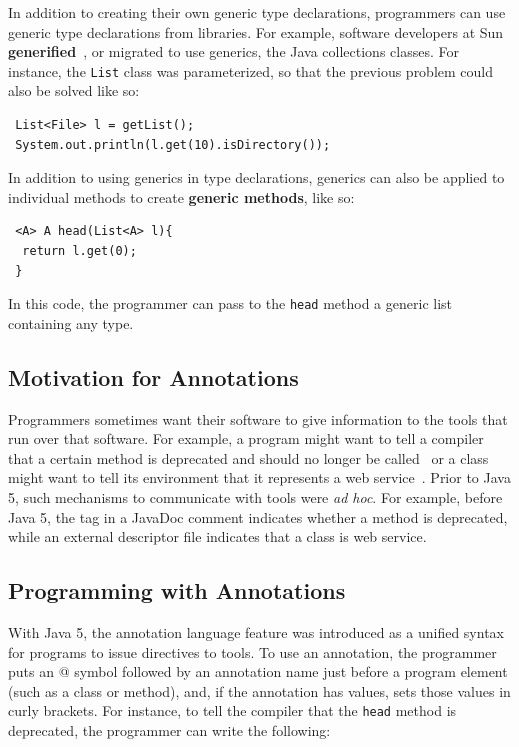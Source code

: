 \documentclass{svjour3}
\newcommand{\code}[1]{\texttt{#1}}
\begin{document}
In addition to creating their own generic type declarations, programmers can use
generic type declarations from libraries.
For example, software developers at Sun 
\textbf{generified}~\cite{tutorial}, or migrated to use generics, 
the Java collections classes.
For instance, the \code{List} class was parameterized, so that the
previous problem could also be solved like so:

\begin{lstlisting}
 List<File> l = getList();
 System.out.println(l.get(10).isDirectory());
\end{lstlisting}


In addition to using generics in type declarations, 
generics can also be applied to individual methods to
create \textbf{generic methods}, like so:

\begin{lstlisting}
 <A> A head(List<A> l){
  return l.get(0);
 }
\end{lstlisting}

\noindent
In this code, the programmer can pass to the \code{head} method a
generic list containing any type.

\subsection{Motivation for Annotations}

Programmers sometimes want their software to give information
to the tools that run over that software.
For example, a program might want to tell a compiler that a certain
method is deprecated and should no longer be called~\cite{annotation_guide} or a class
might want to tell its environment that it represents a web service~\cite{annotation_interview}.
Prior to Java 5, such mechanisms to communicate with 
tools were \emph{ad hoc}.
For example, before Java 5, 
the \code{\@Deprecated} tag in a JavaDoc comment
indicates whether a method is deprecated,
while an external descriptor file indicates that a class is web service.

\subsection{Programming with Annotations}

With Java 5, the annotation language feature was introduced as a unified
syntax for programs to issue directives to tools.
To use an annotation, the programmer puts an @ symbol followed by an annotation
name just before a program element (such as a class or method), 
and, if the annotation has values, sets those values in curly brackets.
For instance, to tell the compiler that the \code{head} method is deprecated, the programmer
can write the following:
\end{document}
